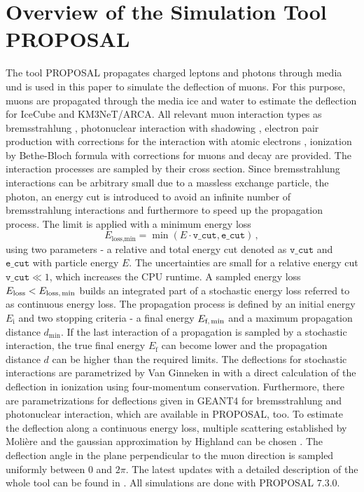 \documentclass[pdflatex, sn-mathphys]{sn-jnl}%
\theoremstyle{thmstyleone}%
\theoremstyle{thmstyletwo}%
\theoremstyle{thmstylethree}%
\begin{document}
\section{Overview of the Simulation Tool PROPOSAL}\label{sec:proposal}

The tool PROPOSAL propagates charged leptons and photons through media und is 
used in this paper to simulate the deflection of muons. For this purpose, 
muons are propagated through the media ice and water 
to estimate the deflection for IceCube and KM3NeT/ARCA. All relevant muon interaction types 
as bremsstrahlung \cite{KKP_1995, Karnaukhov_1999}, photonuclear interaction \cite{Abramowicz_1997} with 
shadowing \cite{ButkevichMikheyev_2002}, electron pair production \cite{KKP_proc} with corrections for the 
interaction with atomic electrons \cite{Kelner_1998}, 
ionization by Bethe-Bloch formula with corrections for muons \cite{Rossi} and decay are provided. The interaction processes are sampled by their cross section. Since bremsstrahlung interactions can be 
arbitrary small due to a massless exchange particle, the photon, an energy cut is introduced to avoid an infinite number of bremsstrahlung interactions 
and furthermore to speed up the propagation process. 
The limit is applied with a minimum energy loss
\begin{equation}
    E_{\text{loss,min}} = \min{(E \cdot \texttt{v\_cut}, \texttt{e\_cut})}\,,
\end{equation}
using two parameters - a relative and total energy cut denoted as 
$\texttt{v\_cut}$ and $\texttt{e\_cut}$ with particle energy $E$. The uncertainties are small 
for a relative energy cut $\texttt{v\_cut}\ll 1$, which increases the 
CPU runtime.
A sampled energy loss 
$E_{\text{loss}} < E_{\text{loss,\,min}}$ builds an integrated part of a 
stochastic energy loss referred to as continuous energy loss. The 
propagation process is defined by an initial energy $E_{\text{i}}$ and 
two stopping criteria - a final energy $E_{\text{f,\,min}}$ and a 
maximum propagation distance $d_{\text{min}}$. If the last interaction of 
a propagation is sampled by a stochastic interaction, the true final energy 
$E_{\text{f}}$ can become lower and the 
propagation distance $d$ can be higher than the required limits. 
The deflections for stochastic interactions are parametrized by Van Ginneken 
in \cite{Van_Ginneken} with a direct calculation of the deflection in 
ionization using four-momentum conservation. 
Furthermore, there are parametrizations for deflections given in GEANT4 \cite{GEANT4} 
for bremsstrahlung and photonuclear interaction, which 
are available in PROPOSAL, too.
To estimate the deflection along 
a continuous energy loss, multiple scattering established by Molière 
\cite{moliere_scattering} and the gaussian approximation by Highland 
can be chosen \cite{HIGHLAND_1975}. 
The deflection angle in the plane perpendicular to the muon direction is 
sampled uniformly between $0$ and $2\pi$.
The latest updates with a detailed description of the whole tool can be found 
in \cite{phd_soedingrekso}.
All simulations are done with PROPOSAL $7.3.0$.
\end{document}
